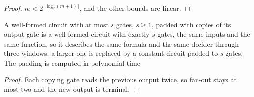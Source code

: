\begin{proof}
\leanok
$m < 2^{\lceil \log_2 (m + 1) \rceil}$, and the other bounds are linear.
\end{proof}

\begin{lemma}
\label{lem:circuit-pad-exact}
\leanok
A well-formed circuit with at most $s$ gates, $s \geq 1$, padded with copies of its output gate
is a well-formed circuit with exactly $s$ gates, the same inputs and the same function, so it
describes the same formula and the same decider through three windows; a larger one is replaced
by a constant circuit padded to $s$ gates. The padding is computed in polynomial time.
\end{lemma}

\begin{proof}
\leanok
Each copying gate reads the previous output twice, so fan-out stays at most two and the new output
is terminal.
\end{proof}

